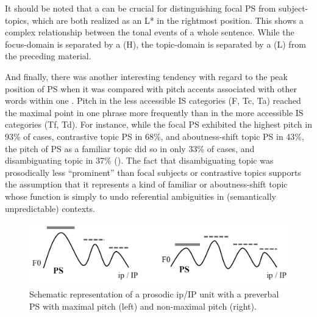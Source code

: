 \documentclass[output=paper]{langsci/langscibook}
\begin{document}
It should be noted that a  can be crucial for distinguishing focal PS from subject-topics, which are both realized as an L* in the rightmost position. This shows a complex relationship between the tonal events of a whole sentence. While the focus-domain is separated by a  (H\textminus{}), the topic-domain is separated by a  (L\textminus{}) from the preceding  material.

And finally, there was another interesting tendency with regard to the peak position of PS when it was compared with pitch accents associated with other words within one . Pitch in the less accessible IS categories (F, Tc, Ta) reached the maximal point in one  phrase more frequently than in the more accessible IS categories (Tf, Td). For instance, while the focal PS exhibited the highest pitch in 93\% of cases, contrastive topic PS in 68\%, and aboutness-shift topic PS in 43\%, the pitch of PS as a familiar topic did so in only 33\% of cases, and disambiguating topic in 37\% (). The fact that disambiguating topic was prosodically less ``prominent'' than focal subjects or contrastive topics supports the assumption that it represents a kind of familiar or aboutness-shift topic whose function is simply to undo referential ambiguities in (semantically unpredictable) contexts.\largerpage[-3]

  
\begin{figure}
\includegraphics[width=.8\textwidth]{figures/pes-img20new.png}
 \caption{Schematic representation of a prosodic ip/IP unit with a preverbal PS with maximal pitch (left) and non-maximal pitch (right).}
 \label{fig:pes:20}
\end{figure}
 
\end{document}
